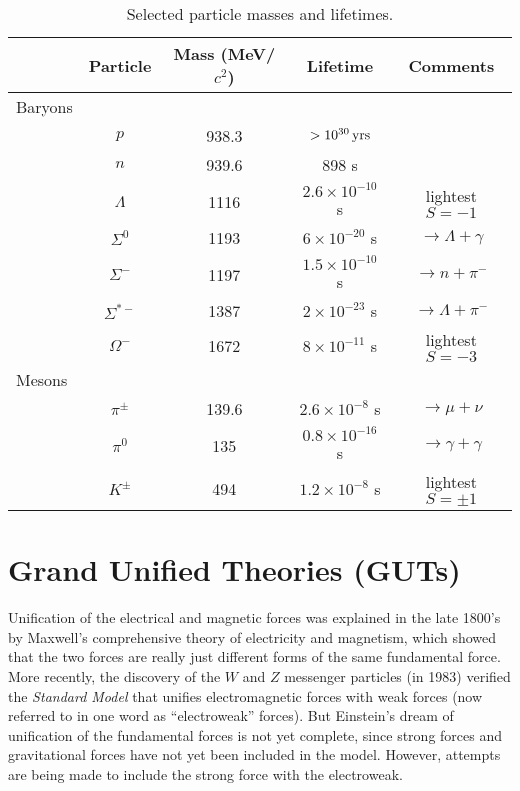 \begin{table}[!b]
\caption{Selected particle masses and lifetimes.}
\label{table:mass_lifetimes}
\begin{center}
\begin{tabular}[tbp]{lcccc}
& Particle & Mass (MeV/$c^2$) & Lifetime & Comments \\
\hline\hline
Baryons & \\
& $p$ & 938.3 & $>10^{30}\,\mbox{yrs}$ & \\
& $n$ & 939.6 & 898 s & \\
& $\Lambda$ &  1116 & $2.6\times 10^{-10}$ s & lightest $S = -1$ \\
& $\Sigma^0$ & 1193 & $6\times 10^{-20}$ s & $\to \Lambda + \gamma$ \\
& $\Sigma^-$ & 1197 & $1.5\times 10^{-10}$ s & $\to n + \pi^-$ \\
& $\Sigma^{*-}$ & 1387 & $2\times 10^{-23}$ s & $\to \Lambda + \pi^-$ \\
& $\Omega^-$ & 1672 & $8\times 10^{-11}$ s & lightest $S = -3$\\
Mesons & \\
& $\pi^\pm$  & 139.6 & $2.6\times 10^{-8}$ s & $\to \mu + \nu$\\
& $\pi^0$    & 135   & $0.8\times 10^{-16}$ s & $\to\gamma + \gamma$\\
& $K^\pm$    & 494   & $1.2\times 10^{-8}$ s & lightest $S = \pm 1$\\
\hline
\end{tabular}
\end{center}
\end{table}

\section{Grand Unified Theories (GUTs)}
\label{sec:guts}
Unification of the electrical and magnetic forces was explained in the
late 1800's by Maxwell's comprehensive theory of electricity and
magnetism, which showed that the two forces are really just different
forms of the same fundamental force.  More recently, the discovery of
the $W$ and $Z$ messenger particles (in 1983) verified the {\em Standard
Model} that unifies electromagnetic forces with weak forces (now
referred to in one word as ``electroweak'' forces).  But Einstein's
dream of unification of the fundamental forces is not yet complete,
since strong forces and gravitational forces have not yet been
included in the model.  However, attempts are being made to include
the strong force with the electroweak.

